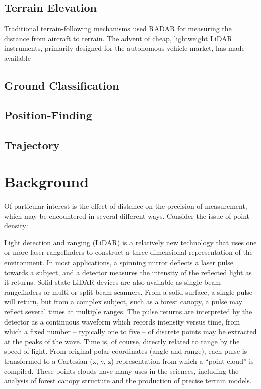 \documentclass[10pt,a4paper]{report}
\begin{document}
\subsection{Terrain Elevation}

Traditional terrain-following mechanisms used RADAR for measuring the distance from aircraft to terrain. The advent of cheap, lightweight LiDAR instruments, primarily designed for the autonomous vehicle market, has made available 

\subsection{Ground Classification}

\subsection{Position-Finding}

\subsection{Trajectory}


\section{Background}

Of particular interest is the effect of distance on the precision of measurement, which may be encountered in several different ways. Consider the issue of point density:

Light detection and ranging (LiDAR) is a relatively new technology that uses one or more laser rangefinders to construct a three-dimensional representation of the environment. In most applications, a spinning mirror deflects a laser pulse towards a subject, and a detector measures the intensity of the reflected light as it returns. Solid-state LiDAR devices are also available as single-beam rangefinders or multi-or split-beam scanners. From a solid surface, a single pulse will return, but from a complex subject, such as a forest canopy, a pulse may reflect several times at multiple ranges. The pulse returns are interpreted by the detector as a continuous waveform which records intensity versus time, from which a fixed number -- typically one to five -- of discrete points may be extracted at the peaks of the wave. Time is, of course, directly related to range by the speed of light. From original polar coordinates (angle and range), each pulse is transformed to a Cartesian (x, y, z) representation from which a “point cloud” is compiled. These points clouds have many uses in the sciences, including the analysis of forest canopy structure and the production of precise terrain models. 
\end{document}
